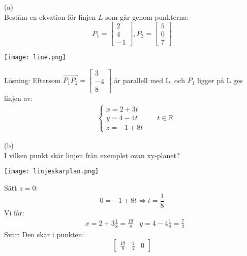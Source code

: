 \begin{Ex} (a)\\
    Bestäm en ekvation för linjen $L$ som går genom punkterna:
    \[
        P_1 = \begin{bmatrix} 2\\4\\-1 \end{bmatrix}, P_2 = \begin{bmatrix} 5\\0\\7 \end{bmatrix}
    \]
    \begin{center}
        \texttt{[image: line.png]}
    \end{center}
    Lösning:
    Eftersom $\overrightarrow{P_1P_2} = \begin{bmatrix} 3\\-4\\8 \end{bmatrix}$ är parallell med L, och $P_1$ ligger på L ges linjen av:
    \begin{align*}
    &\begin{cases}
        x=2+3t\\y=4-4t\\z=-1+8t
    \end{cases}
    &&t\in \mathbb{R}
    \end{align*}
\end{Ex}
\newpage
\begin{Ex} (b)\\
    I vilken punkt skär linjen från exemplet ovan xy-planet?
    \begin{center}
        \texttt{[image: linjeskarplan.png]}
    \end{center}
    Sätt $z = 0$:
    \[
        0 = -1 + 8t \Leftrightarrow t = \frac{1}{8}
    \]
    Vi får:
    \begin{align*}
    &x= 2 + 3 \frac{1}{8} = \frac{19}{8}
    &y=4-4 \frac{1}{8} = \frac{7}{2}
    \end{align*}
    Svar: Den skär i punkten:
    \[
        \begin{bmatrix} \frac{19}{8} & \frac{7}{2} & 0 \end{bmatrix}
    \]
    
\end{Ex}



 






















